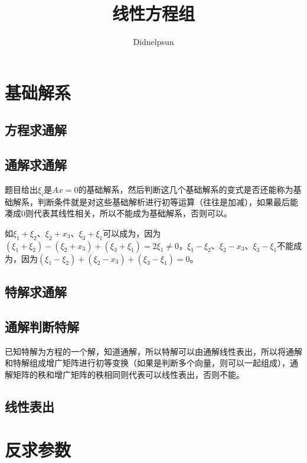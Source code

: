 \documentclass[UTF8, 12pt]{ctexart}
\author{Didnelpsun}
\title{线性方程组}
\date{}
\begin{document}
\maketitle
\pagestyle{empty}
\thispagestyle{empty}
\tableofcontents
\thispagestyle{empty}
\newpage
\pagestyle{plain}
\setcounter{page}{1}
\section{基础解系}

\subsection{方程求通解}

\subsection{通解求通解}

题目给出$\xi_i$是$Ax=0$的基础解系，然后判断这几个基础解系的变式是否还能称为基础解系，判断条件就是对这些基础解析进行初等运算（往往是加减），如果最后能凑成0则代表其线性相关，所以不能成为基础解系，否则可以。

如$\xi_1+\xi_2$、$\xi_2+x_3$、$\xi_3+\xi_1$可以成为，因为$(\xi_1+\xi_2)-(\xi_2+x_3)+(\xi_3+\xi_1)=2\xi_1\neq0$，$\xi_1-\xi_2$、$\xi_2-x_3$、$\xi_3-\xi_1$不能成为，因为$(\xi_1-\xi_2)+(\xi_2-x_3)+(\xi_3-\xi_1)=0$。

\subsection{特解求通解}

\subsection{通解判断特解}

已知特解为方程的一个解，知道通解，所以特解可以由通解线性表出，所以将通解和特解组成增广矩阵进行初等变换（如果是判断多个向量，则可以一起组成），通解矩阵的秩和增广矩阵的秩相同则代表可以线性表出，否则不能。

\subsection{线性表出}

\section{反求参数}
\end{document}
